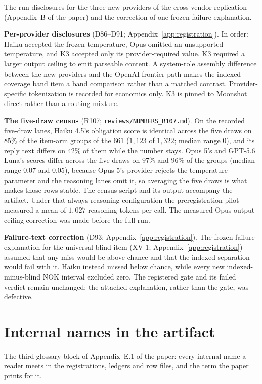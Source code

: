 \documentclass{article}
\begin{document}
The run disclosures for the three new providers of the cross-vendor replication (Appendix~B of the paper) and the correction of one frozen failure explanation.

\noindent\textbf{Per-provider disclosures} (D86--D91; Appendix~\ref{app:registration}).
In order: Haiku accepted the frozen temperature, Opus omitted an unsupported temperature, and K3 accepted only its provider-required value.
K3 required a larger output ceiling to emit parseable content.
A system-role assembly difference between the new providers and the OpenAI frontier path makes the indexed-coverage band item a band comparison rather than a matched contrast.
Provider-specific tokenization is recorded for economics only.
K3 is pinned to Moonshot direct rather than a routing mixture.

\noindent\textbf{The five-draw census} (R107; \texttt{reviews/NUMBERS\_R107.md}).
On the recorded five-draw lanes, Haiku 4.5's obligation score is identical across the five draws on $85\%$ of the item-arm groups of the $661$ ($1{,}123$ of $1{,}322$; median range $0$), and its reply text differs on $42\%$ of them while the number stays.
Opus 5's and GPT-5.6 Luna's scores differ across the five draws on $97\%$ and $96\%$ of the groups (median range $0.07$ and $0.05$), because Opus 5's provider rejects the temperature parameter and the reasoning lanes omit it, so averaging the five draws is what makes those rows stable.
The census script and its output accompany the artifact.
Under that always-reasoning configuration the preregistration pilot measured a mean of $1{,}027$ reasoning tokens per call.
The measured Opus output-ceiling correction was made before the full run.

\noindent\textbf{Failure-text correction} (D93; Appendix~\ref{app:registration}).
The frozen failure explanation for the universal-blind item (XV-1; Appendix~\ref{app:registration}) assumed that any miss would be above chance and that the indexed separation would fail with it.
Haiku instead missed below chance, while every new indexed-minus-blind NOK interval excluded zero.
The registered gate and its failed verdict remain unchanged; the attached explanation, rather than the gate, was defective.

\section{Internal names in the artifact}\label{sup:names}

The third glossary block of Appendix~E.1 of the paper: every internal name a reader meets in the registrations, ledgers and row files, and the term the paper prints for it.
\end{document}
